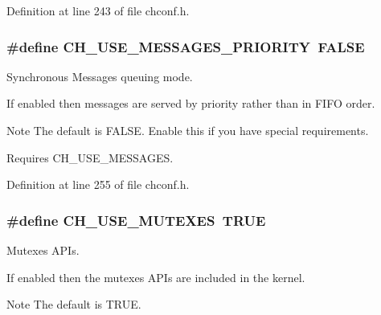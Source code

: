 Definition at line 243 of file chconf.\+h.

\hypertarget{group__config_gaf48947f33ed7a44a7701d84d83d94a1c}{}
\subsubsection[{C\+H\+\_\+\+U\+S\+E\+\_\+\+M\+E\+S\+S\+A\+G\+E\+S\+\_\+\+P\+R\+I\+O\+R\+I\+T\+Y}]{\setlength{\rightskip}{0pt plus 5cm}\#define C\+H\+\_\+\+U\+S\+E\+\_\+\+M\+E\+S\+S\+A\+G\+E\+S\+\_\+\+P\+R\+I\+O\+R\+I\+T\+Y~F\+A\+L\+S\+E}\label{group__config_gaf48947f33ed7a44a7701d84d83d94a1c}


Synchronous Messages queuing mode. 

If enabled then messages are served by priority rather than in F\+I\+F\+O order.

\begin{DoxyNote}{Note}
The default is {\ttfamily F\+A\+L\+S\+E}. Enable this if you have special requirements. 

Requires {\ttfamily C\+H\+\_\+\+U\+S\+E\+\_\+\+M\+E\+S\+S\+A\+G\+E\+S}. 
\end{DoxyNote}


Definition at line 255 of file chconf.\+h.

\hypertarget{group__config_ga4f461a7b5edbff2405b7b40d2bb238a6}{}
\subsubsection[{C\+H\+\_\+\+U\+S\+E\+\_\+\+M\+U\+T\+E\+X\+E\+S}]{\setlength{\rightskip}{0pt plus 5cm}\#define C\+H\+\_\+\+U\+S\+E\+\_\+\+M\+U\+T\+E\+X\+E\+S~T\+R\+U\+E}\label{group__config_ga4f461a7b5edbff2405b7b40d2bb238a6}


Mutexes A\+P\+Is. 

If enabled then the mutexes A\+P\+Is are included in the kernel.

\begin{DoxyNote}{Note}
The default is {\ttfamily T\+R\+U\+E}. 
\end{DoxyNote}


